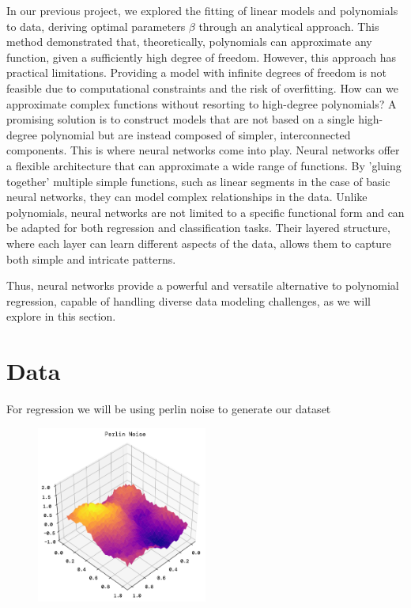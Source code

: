 \documentclass[twoside,11pt]{report}
\begin{document}
    In our previous project\cite{MachineLearningProjects_2023}, we explored the fitting of linear models and 
    polynomials to data, deriving optimal parameters \(\beta\) through an analytical approach. 
    This method demonstrated that, theoretically, polynomials can approximate any function, given a sufficiently 
    high degree of freedom. However, this approach has practical limitations. 
    Providing a model with infinite degrees of freedom is not feasible due to computational constraints 
    and the risk of overfitting. How can we approximate complex functions without resorting to high-degree 
    polynomials? A promising solution is to construct models that are not based on a single high-degree polynomial 
    but are instead composed of simpler, interconnected components. This is where neural networks come into play.
    Neural networks offer a flexible architecture that can approximate a wide range of functions. By 'gluing together' 
    multiple simple functions, such as linear segments in the case of basic neural networks, they can model complex 
    relationships in the data. Unlike polynomials, neural networks are not limited to a specific functional form and 
    can be adapted for both regression and classification tasks. Their layered structure, where each layer can learn 
    different aspects of the data, allows them to capture both simple and intricate patterns.

    Thus, neural networks provide a powerful and versatile alternative to polynomial regression, capable of handling 
    diverse data modeling challenges, as we will explore in this section.



\section*{Data}

    For regression we will be using perlin noise to generate our dataset 

    \begin{figure}
        \begin{center}
            \includegraphics[width=0.5\textwidth]{../runsAndFigures/perlinNoise.png}
        \end{center}
        \caption{}\label{fig:perlin}
    \end{figure}
\end{document}
